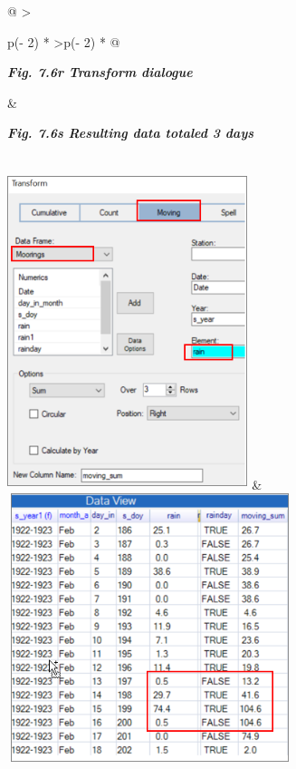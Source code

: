 \documentclass[
  letterpaper,
  DIV=11,
  numbers=noendperiod]{scrreprt}
\begin{document}
\begin{longtable}[]{@{}
  >{\raggedright\arraybackslash}p{(\columnwidth - 2\tabcolsep) * }
  >{\raggedleft\arraybackslash}p{(\columnwidth - 2\tabcolsep) * }@{}}
\toprule\noalign{}
\begin{minipage}[b]{\linewidth}\raggedright
\textbf{\emph{Fig. 7.6r Transform dialogue}}
\end{minipage} & \begin{minipage}[b]{\linewidth}\raggedleft
\textbf{\emph{Fig. 7.6s Resulting data totaled 3 days}}
\end{minipage} \\
\midrule\noalign{}
\endhead
\bottomrule\noalign{}
\endlastfoot
\includegraphics[width=2.76554in,height=3.63142in]{figures/Fig7.6r.png}
&
\includegraphics[width=3.2882in,height=3.08744in]{figures/Fig7.6s.png} \\
\end{longtable}
\end{document}
